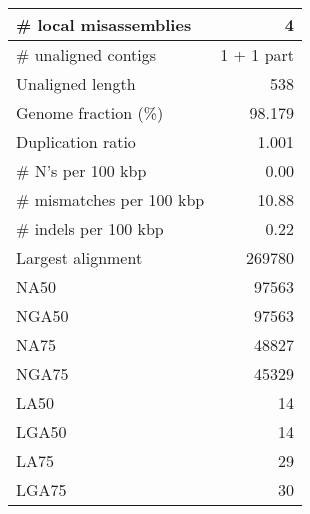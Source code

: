 \documentclass[12pt,a4paper]{article}
\begin{document}
\begin{table}[ht]
\begin{center}
\begin{tabular}{|l*{1}{|r}|}
\# local misassemblies & 4 \\ \hline
\# unaligned contigs & 1 + 1 part \\ \hline
Unaligned length & 538 \\ \hline
Genome fraction (\%) & 98.179 \\ \hline
Duplication ratio & 1.001 \\ \hline
\# N's per 100 kbp & 0.00 \\ \hline
\# mismatches per 100 kbp & 10.88 \\ \hline
\# indels per 100 kbp & 0.22 \\ \hline
Largest alignment & 269780 \\ \hline
NA50 & 97563 \\ \hline
NGA50 & 97563 \\ \hline
NA75 & 48827 \\ \hline
NGA75 & 45329 \\ \hline
LA50 & 14 \\ \hline
LGA50 & 14 \\ \hline
LA75 & 29 \\ \hline
LGA75 & 30 \\ \hline
\end{tabular}
\end{center}
\end{table}
\end{document}
